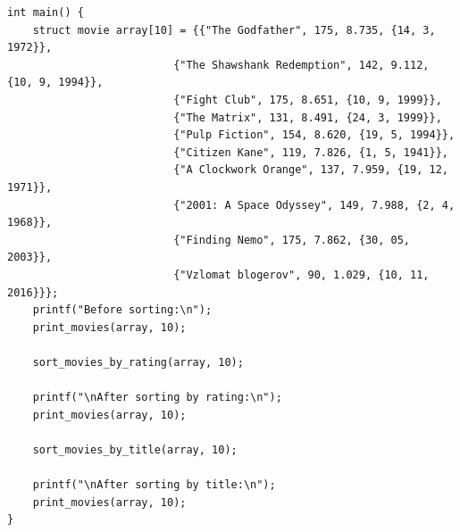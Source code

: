 \documentclass{article}
\begin{document}
\begin{itemize}
\begin{lstlisting}[backgroundcolor = \color{solcolor}]
int main() {
    struct movie array[10] = {{"The Godfather", 175, 8.735, {14, 3, 1972}},
                          {"The Shawshank Redemption", 142, 9.112, {10, 9, 1994}},
                          {"Fight Club", 175, 8.651, {10, 9, 1999}},
                          {"The Matrix", 131, 8.491, {24, 3, 1999}},
                          {"Pulp Fiction", 154, 8.620, {19, 5, 1994}},
                          {"Citizen Kane", 119, 7.826, {1, 5, 1941}},
                          {"A Clockwork Orange", 137, 7.959, {19, 12, 1971}},
                          {"2001: A Space Odyssey", 149, 7.988, {2, 4, 1968}},
                          {"Finding Nemo", 175, 7.862, {30, 05, 2003}},
                          {"Vzlomat blogerov", 90, 1.029, {10, 11, 2016}}};
    printf("Before sorting:\n");
    print_movies(array, 10);
    
    sort_movies_by_rating(array, 10);
    
    printf("\nAfter sorting by rating:\n");
    print_movies(array, 10);
    
    sort_movies_by_title(array, 10);
    
    printf("\nAfter sorting by title:\n");
    print_movies(array, 10);
}
\end{lstlisting}

\end{itemize}


\newpage
\end{document}
